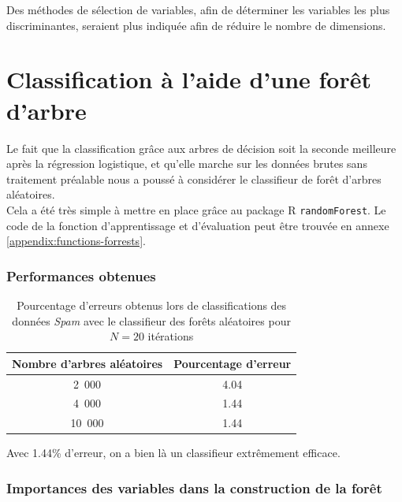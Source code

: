 \documentclass[a4paper,10pt]{report}
\begin{document}
Des méthodes de sélection de variables, afin de déterminer les variables les plus discriminantes, seraient plus indiquée afin de réduire le nombre de dimensions.

\section{Classification à l'aide d'une forêt d'arbre}


Le fait que la classification grâce aux arbres de décision soit la seconde meilleure après la régression logistique, et qu'elle marche sur les données brutes sans traitement préalable nous a poussé à considérer le classifieur de forêt d'arbres aléatoires.\\

Cela a été très simple à mettre en place grâce au package R \texttt{randomForest}. Le code de la fonction d'apprentissage et d'évaluation peut être trouvée en annexe \autoref{appendix:functions-forrests}.

\subsubsection{Performances obtenues}

\begin{table}[H]
	\centering
	\captionsetup{justification=centering, margin=4cm}
	\begin{tabular}{c|c}
		Nombre d'arbres aléatoires & Pourcentage d'erreur  \\ 
		\hline
		2~000 & 4.04 \\ 
		4~000 & 1.44 \\ 
		10~000 & 1.44 \\ 
	\end{tabular}
	\caption{\small Pourcentage d'erreurs obtenus lors de classifications des données \textit{Spam} avec le classifieur des forêts aléatoires pour $N = 20$ itérations}
	\label{table:3-4-Spam-forests-error-rates}
\end{table}


Avec 1.44\% d'erreur, on a bien là un classifieur extrêmement efficace.


\subsubsection{Importances des variables dans la construction de la forêt}
\end{document}
